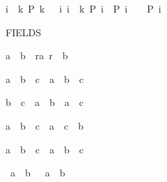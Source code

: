 \begin{isabellebody}
\begin{isamarkuptext}
\begin{isabelle}%
{\isasymlbrakk}i\ {\isacharless}\ k{\isacharsemicolon}\ P\ {\isacharparenleft}k\ {\isacharminus}\ {}{\isacharparenright}{\isacharsemicolon}\ {\isasymAnd}i{\isachardot}\ {\isasymlbrakk}i\ {\isacharless}\ k{\isacharsemicolon}\ P\ i{\isasymrbrakk}\ {\isasymLongrightarrow}\ P\ {\isacharparenleft}i\ {\isacharminus}\ {}{\isacharparenright}{\isasymrbrakk}\ {\isasymLongrightarrow}\ P\ i%
\end{isabelle}
%
\end{isamarkuptext}%
\isamarkuptrue%
%
\begin{isamarkuptext}%
FIELDS

\begin{isabelle}%
a\ {\isacharless}\ b\ {\isasymLongrightarrow}\ {\isasymexists}r{\isachargreater}a{\isachardot}\ r\ {\isacharless}\ b%
\end{isabelle}

\begin{isabelle}%
a\ {\isacharasterisk}\ {\isacharparenleft}b\ {\isacharslash}\ c{\isacharparenright}\ {\isacharequal}\ a\ {\isacharasterisk}\ b\ {\isacharslash}\ c%
\end{isabelle}

\begin{isabelle}%
b\ {\isacharslash}\ c\ {\isacharasterisk}\ a\ {\isacharequal}\ b\ {\isacharasterisk}\ a\ {\isacharslash}\ c%
\end{isabelle}

\begin{isabelle}%
a\ {\isacharslash}\ {\isacharparenleft}b\ {\isacharslash}\ c{\isacharparenright}\ {\isacharequal}\ a\ {\isacharasterisk}\ c\ {\isacharslash}\ b%
\end{isabelle}

\begin{isabelle}%
a\ {\isacharslash}\ b\ {\isacharslash}\ c\ {\isacharequal}\ a\ {\isacharslash}\ {\isacharparenleft}b\ {\isacharasterisk}\ c{\isacharparenright}%
\end{isabelle}

\begin{isabelle}%
{\isacharminus}\ {\isacharparenleft}a\ {\isacharslash}\ b{\isacharparenright}\ {\isacharequal}\ {\isacharminus}\ a\ {\isacharslash}\ b%
\end{isabelle}


\end{isamarkuptext}
\end{isabellebody}
